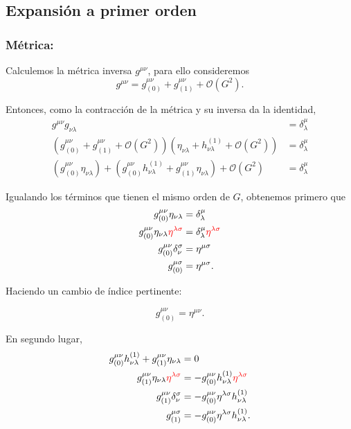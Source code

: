 \documentclass[letterpaper,11pt]{article}
\begin{document}
\subsection*{Expansión a primer orden}

\subsubsection*{Métrica:}

Calculemos la métrica inversa $g^{\mu\nu}$, para ello consideremos
\begin{equation}
g^{\mu\nu} = g_{(0)}^{\mu\nu} + g_{(1)}^{\mu\nu} + \mathcal{O}(G^2).
\end{equation}

Entonces, como la contracción de la métrica y su inversa da la identidad,
\begin{align}
g^{\mu\nu} g_{\nu\lambda} &= \delta^{\mu}_{\lambda} \\
\left( g_{(0)}^{\mu\nu} + g_{(1)}^{\mu\nu} + \mathcal{O}(G^2)\right) \left(\eta_{\nu\lambda} + h_{\nu\lambda}^{(1)} + \mathcal{O}(G^2) \right) &= \delta^{\mu}_{\lambda} \\
\left(g_{(0)}^{\mu\nu} \eta_{\nu\lambda}\right) + \left(g_{(0)}^{\mu\nu} h_{\nu\lambda}^{(1)} +  g_{(1)}^{\mu\nu} \eta_{\nu\lambda} \right) + \mathcal{O}(G^2)  &= \delta^{\mu}_{\lambda}
\end{align} 

Igualando los términos que tienen el mismo orden de $G$, obtenemos primero que
\begin{align}
g_{(0)}^{\mu\nu} \eta_{\nu\lambda} &=  \delta^{\mu}_{\lambda} \\
g_{(0)}^{\mu\nu} \eta_{\nu\lambda} \textcolor{red}{\eta^{\lambda \sigma}} &= \delta^{\mu}_{\lambda} \textcolor{red}{\eta^{\lambda \sigma}} \\
g_{(0)}^{\mu\nu} \delta_{\nu}^{\sigma}&= \eta^{\mu\sigma}  \\
g_{(0)}^{\mu\sigma} &= \eta^{\mu\sigma}.
\end{align}

Haciendo un cambio de índice pertinente:
\begin{shaded}
\begin{equation}
g_{(0)}^{\mu\nu} = \eta^{\mu\nu}. \label{eq:First-Order-1}
\end{equation}
\end{shaded}

En segundo lugar,
\begin{align}
g_{(0)}^{\mu\nu} h_{\nu\lambda}^{(1)} +  g_{(1)}^{\mu\nu} \eta_{\nu\lambda}  &= 0 \\
g_{(1)}^{\mu\nu} \eta_{\nu\lambda}  \textcolor{red}{\eta^{\lambda \sigma}} &= - g_{(0)}^{\mu\nu} h_{\nu\lambda}^{(1)} \textcolor{red}{\eta^{\lambda \sigma}} \\
g_{(1)}^{\mu\nu} \delta_{\nu}^{\sigma} &= - g_{(0)}^{\mu\nu} \eta^{\lambda \sigma}  h_{\nu\lambda}^{(1)} \\
g_{(1)}^{\mu\sigma} &= - g_{(0)}^{\mu\nu} \eta^{\lambda \sigma}  h_{\nu\lambda}^{(1)}. \label{eq:First-Order-2}
\end{align}
\end{document}
